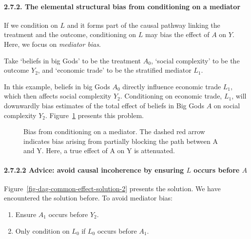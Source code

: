\documentclass[
  singlecolumn]{article}
\let\oldparagraph\paragraph
\renewcommand{\paragraph}[1]{\oldparagraph{#1}\mbox{}}
\providecommand{\tightlist}{%
  \setlength{\itemsep}{0pt}\setlength{\parskip}{0pt}}\usepackage{longtable,booktabs,array}
\begin{document}
\paragraph{2.7.2. The elemental structural bias from conditioning on a
mediator}\label{the-elemental-structural-bias-from-conditioning-on-a-mediator}

If we condition on \(L\) and it forms part of the causal pathway linking
the treatment and the outcome, conditioning on \(L\) may bias the effect
of \(A\) on \(Y\). Here, we focus on \emph{mediator bias}.

Take `beliefs in big Gods' to be the treatment \(A_{0}\), `social
complexity' to be the outcome \(Y_{2}\), and `economic trade' to be the
stratified mediator \(L_{1}\).

In this example, beliefs in big Gods \(A_{0}\) directly influence
economic trade \(L_{1}\), which then affects social complexity
\(Y_{2}\). Conditioning on economic trade, \(L_{1}\), will downwardly
bias estimates of the total effect of beliefs in Big Gods \(A\) on
social complexity \(Y_{2}\). Figure~\ref{fig-dag-mediator} presents this
problem.

\begin{figure}


\caption{\label{fig-dag-mediator}Bias from conditioning on a mediator.
The dashed red arrow indicates bias arising from partially blocking the
path between A and Y. Here, a true effect of A on Y is attenuated.}

\end{figure}%

\paragraph{\texorpdfstring{2.7.2.2 Advice: avoid causal incoherence by
ensuring \(L\) occurs before
\(A\)}{2.7.2.2 Advice: avoid causal incoherence by ensuring L occurs before A}}\label{advice-avoid-causal-incoherence-by-ensuring-l-occurs-before-a-1}

Figure~\ref{fig-dag-common-effect-solution-2} presents the solution. We
have encountered the solution before. To avoid mediator bias:

\begin{enumerate}
\def\labelenumi{\arabic{enumi}.}
\tightlist
\item
  Ensure \(A_1\) occurs before \(Y_2\).
\item
  Only condition on \(L_0\) if \(L_0\) occurs before \(A_1\).
\end{enumerate}
\end{document}
